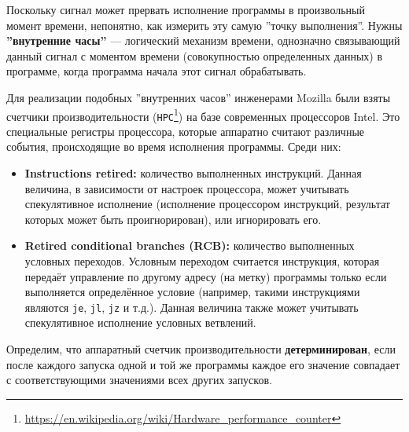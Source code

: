 Поскольку сигнал может прервать исполнение программы в произвольный момент
времени, непонятно, как измерить эту самую ''точку выполнения''. Нужны
\textbf{''внутренние часы''} --- логический механизм времени, однозначно
связывающий данный сигнал с моментом времени (совокупностью определенных
данных) в программе, когда программа начала этот сигнал обрабатывать.

Для реализации подобных ''внутренних часов'' инженерами Mozilla \cite{rr-paper}
были взяты счетчики производительности
(\texttt{HPC}\footnote{\url{https://en.wikipedia.org/wiki/Hardware_performance_counter}})
на базе современных процессоров Intel. Это специальные регистры процессора,
которые аппаратно считают различные события, происходящие во время исполнения
программы. Среди них:

\begin{itemize}

  \item \textbf{Instructions retired:} количество выполненных инструкций. 
  Данная величина, в зависимости от настроек процессора, может учитывать
  спекулятивное исполнение (исполнение процессором инструкций, результат
  которых может быть проигнорирован), или игнорировать его.

  \item \textbf{Retired conditional branches (RCB):} количество выполненных условных
  переходов. 
  Условным переходом считается инструкция, которая передаёт управление по другому
  адресу (на метку) программы только если выполняется определённое условие (например,
  такими инструкциями являются \texttt{je}, \texttt{jl}, \texttt{jz} и т.д.).
  Данная величина также может учитывать спекулятивное исполнение условных ветвлений.

\end{itemize}


Определим, что аппаратный счетчик производительности
\textbf{детерминирован}, если после каждого запуска одной и той же программы
каждое его значение совпадает с соответствующими значениями всех других запусков.

